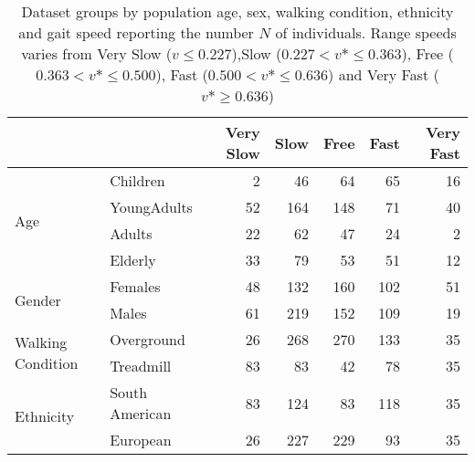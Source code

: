 \begin{table}
\centering
\caption{Dataset groups by population age, sex, walking condition, ethnicity and gait speed reporting the number $N$ of individuals. Range speeds varies from Very Slow ($v \leq 0.227$),Slow ($0.227 < v* \leq 0.363$), Free ($0.363 < v* \leq 0.500$), Fast ($0.500 < v* \leq  0.636$) and Very Fast ($v* \geq 0.636$)}
\label{tab:table1}
\begin{tabular}{llrrrrr}
\toprule
          &          &  Very Slow &       Slow &       Free &       Fast &  Very Fast \\
\midrule
\multirow{4}{*}{Age} & Children &          2 &         46 &         64 &         65 &         16 \\
          & YoungAdults &         52 &        164 &        148 &         71 &         40 \\
          & Adults &         22 &         62 &         47 &         24 &          2 \\
          & Elderly &         33 &         79 &         53 &         51 &         12 \\
\cline{1-7}
\multirow{2}{*}{Gender} & Females &         48 &        132 &        160 &        102 &         51 \\
          & Males &         61 &        219 &        152 &        109 &         19 \\
\cline{1-7}
\multirow{2}{*}{Walking Condition} & Overground &         26 &        268 &        270 &        133 &         35 \\
          & Treadmill &         83 &         83 &         42 &         78 &         35 \\
\cline{1-7}
\multirow{2}{*}{Ethnicity} & South American &         83 &        124 &         83 &        118 &         35 \\
          & European &         26 &        227 &        229 &         93 &         35 \\
\bottomrule
\end{tabular}
\end{table}
